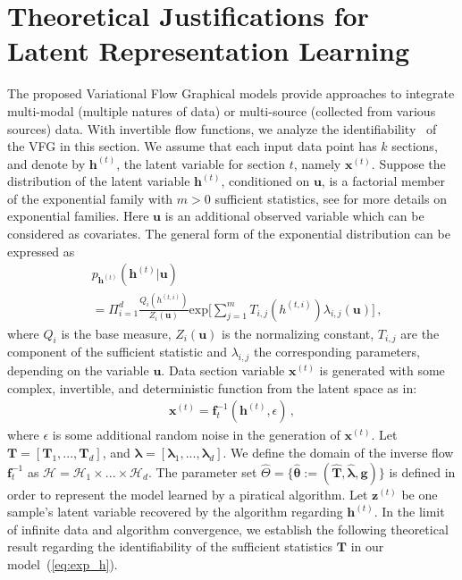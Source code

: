 \documentclass[twoside]{article}
\begin{document}
\section{Theoretical Justifications for Latent Representation Learning}\label{sec:theory}

The proposed Variational Flow Graphical models provide approaches to integrate multi-modal (multiple natures of data) or multi-source (collected from various sources) data. 
With invertible flow functions, we analyze the identifiability~\cite{Khemakhem20a,Sorrenson2020} of the VFG in this section.  
We assume that each input data point has $k$ sections, and denote by $\mathbf{h}^{(t)}$, the latent variable for section $t$, namely $\mathbf{x}^{(t)}$. 
Suppose the distribution of the latent variable $\mathbf{h}^{(t)}$, conditioned on $\mathbf{u}$, is a factorial member of the exponential family with $m > 0$ sufficient statistics, see \cite{efron1975defining} for more details on exponential families. 
Here $\mathbf{u}$ is an additional observed variable which can be considered as covariates.
The general form of the exponential distribution can be expressed as 
\begin{equation}\label{eq:exp_h}
\begin{split}
&p_{\mathbf{h}^{(t)}}(\mathbf{h}^{(t)} | \mathbf{u}) \\
&= \Pi_{i=1}^d \frac{Q_i(h^{(t,i)})}{Z_i(\mathbf{u})} \text{exp}\bigg[ \sum_{j=1}^m T_{i,j}(h^{(t,i)}) \lambda_{i,j}(\mathbf{u}) \bigg]\, ,
\end{split}
\end{equation} 
where $Q_i$ is the base measure, $Z_i(\mathbf{u})$ is the normalizing constant, $T_{i,j}$ are the component of the sufficient statistic and $\lambda_{i,j}$ the corresponding parameters, depending on the variable $\mathbf{u}$. 
Data section variable $\mathbf{x}^{(t)}$ is generated with some complex, invertible, and deterministic function from the latent space as in: 
\begin{align}\label{eq:xt_gen}
\mathbf{x}^{(t)} = \mathbf{f}^{-1}_t(\mathbf{h}^{(t)}, \epsilon)\, ,
\end{align}
where $\epsilon$ is some additional random noise in the generation of $\mathbf{x}^{(t)}$. 
Let $\mathbf{T} =[\mathbf{T}_1, ..., \mathbf{T}_d] $, and $\mathbf{\lambda} =[\mathbf{\lambda}_1, ..., \mathbf{\lambda}_d]$.  
 We define the domain of the inverse flow $\mathbf{f}_t^{-1}$ as $\mathcal{H}=\mathcal{H}_1 \times ... \times \mathcal{H}_d$.
The parameter set $\widehat{\Theta} = \{\widehat{\mathbf{\theta}} := (\widehat{\mathbf{T}}, \widehat{\mathbf{\lambda}}, \mathbf{g} ) \}$ is defined in order to represent the model learned by a piratical algorithm. Let $\mathbf{z}^{(t)}$ be one sample's latent variable recovered by the algorithm regarding $\mathbf{h}^{(t)}$.
In the limit of infinite data and algorithm convergence, we establish the following theoretical result regarding the identifiability of the sufficient statistics $\mathbf{T}$ in our model~(\ref{eq:exp_h}).
\end{document}
